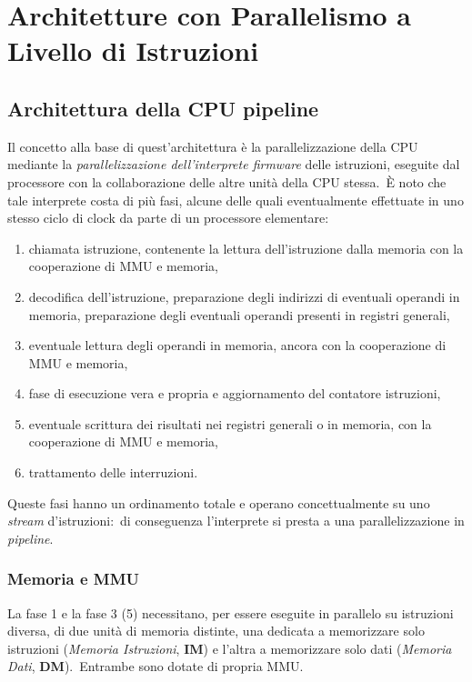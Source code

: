 \chapter{Architetture con Parallelismo a Livello di Istruzioni}

\section{Architettura della CPU pipeline}

Il concetto alla base di quest'architettura è la parallelizzazione della CPU mediante la \textit{parallelizzazione dell'interprete firmware} delle istruzioni, eseguite dal processore con la collaborazione delle altre unità della CPU stessa.\
È noto che tale interprete costa di più fasi, alcune delle quali eventualmente effettuate in uno stesso ciclo di clock da parte di un processore elementare:

\begin{enumerate}
    \item chiamata istruzione, contenente la lettura dell'istruzione dalla memoria con la cooperazione di MMU e memoria,
    \item decodifica dell'istruzione, preparazione degli indirizzi di eventuali operandi in memoria, preparazione degli eventuali operandi presenti in registri generali,
    \item eventuale lettura degli operandi in memoria, ancora con la cooperazione di MMU e memoria,
    \item fase di esecuzione vera e propria e aggiornamento del contatore istruzioni,
    \item eventuale scrittura dei risultati nei registri generali o in memoria, con la cooperazione di MMU e memoria,
    \item trattamento delle interruzioni.
\end{enumerate}

\noindent Queste fasi hanno un ordinamento totale e operano concettualmente su uno \textit{stream} d'istruzioni:\ di conseguenza l'interprete si presta a una parallelizzazione in \textit{pipeline}.

\subsection{Memoria e MMU}

La fase 1 e la fase 3 (5) necessitano, per essere eseguite in parallelo su istruzioni diversa, di due unità di memoria distinte, una dedicata a memorizzare solo istruzioni (\textit{Memoria Istruzioni}, \textbf{IM}) e l'altra a memorizzare solo dati (\textit{Memoria Dati}, \textbf{DM}).\
Entrambe sono dotate di propria MMU.

